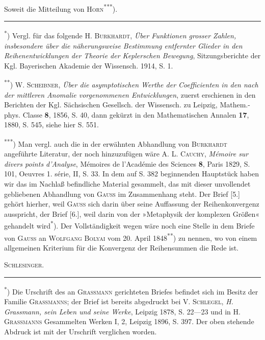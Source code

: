 \indent Soweit die Mitteilung von \textsc{Horn}\textsuperscript{***}).
\par\medskip\noindent\rule{.24\linewidth}{.4pt}\par\smallskip
\noindent\hspace*{\parindent}\textsuperscript{*}) Vergl. für das folgende H. \textsc{Burkhardt}, \textit{Über Funktionen grosser Zahlen, insbesondere über die näherungsweise Bestimmung entfernter Glieder in den Reihenentwicklungen der Theorie der Keplerschen Bewegung}, Sitzungsberichte der Kgl. Bayerischen Akademie der Wissensch. 1914, S. 1.
\par\noindent\hspace*{\parindent}\textsuperscript{**}) W. \textsc{Scheibner}, \textit{Über die asymptotischen Werthe der Coefficienten in den nach der mittleren Anomalie vorgenommenen Entwicklungen}, zuerst erschienen in den Berichten der Kgl. Sächsischen Gesellsch. der Wissensch. zu Leipzig, Mathem.-phys. Classe \textbf{8}, 1856, S. 40, dann gekürzt in den Mathematischen Annalen \textbf{17}, 1880, S. 545, siehe hier S. 551.
\par\noindent\hspace*{\parindent}\textsuperscript{***}) Man vergl. auch die in der erwähnten Abhandlung von \textsc{Burkhardt} angeführte Literatur, der noch hinzuzufügen wäre A. L. \textsc{Cauchy}, \textit{Mémoire sur divers points d'Analyse}, Mémoires de l'Académie des Sciences \textbf{8}, Paris 1829, S. 101, Oeuvres 1. série, II, S. 33.
\clearpage{}
\indent In dem auf S. 382 beginnenden Hauptstück haben wir das im Nachlaß befindliche Material gesammelt, das mit dieser unvollendet gebliebenen Abhandlung von \textsc{Gauss} im Zusammenhang steht. Der Brief [5.] gehört hierher, weil \textsc{Gauss} sich darin über seine Auffassung der Reihenkonvergenz ausspricht, der Brief [6.], weil darin von der »Metaphysik der komplexen Größen« gehandelt wird\textsuperscript{*}). Der Vollständigkeit wegen wäre noch eine Stelle in dem Briefe von \textsc{Gauss} an \textsc{Wolfgang Bolyai} vom 20. April 1848\textsuperscript{**}) zu nennen, wo von einem allgemeinen Kriterium für die Konvergenz der Reihensummen die Rede ist.
\par\hfill\textsc{Schlesinger}.
\par\medskip\noindent\rule{.24\linewidth}{.4pt}\par\smallskip
\noindent\hspace*{\parindent}\textsuperscript{*}) Die Urschrift des an \textsc{Grassmann} gerichteten Briefes befindet sich im Besitz der Familie \textsc{Grassmanns}; der Brief ist bereits abgedruckt bei V. \textsc{Schlegel}, \textit{H. Grassmann, sein Leben und seine Werke}, Leipzig 1878, S. 22—23 und in H. \textsc{Grassmanns} Gesammelten Werken I, 2, Leipzig 1896, S. 397. Der oben stehende Abdruck ist mit der Urschrift verglichen worden.
